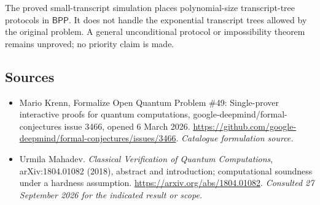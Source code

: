 \documentclass[11pt,a4paper]{article}
\numberwithin{equation}{section}
\begin{document}
The proved small-transcript simulation places polynomial-size transcript-tree
protocols in $\mathsf{BPP}$.  It does not handle the exponential transcript
trees allowed by the original problem.  A general unconditional protocol
or impossibility theorem remains unproved; no priority claim is made.
\subsection{Sources}
\begin{itemize}\raggedright
\item[\textnormal{[S1]}]\hypertarget{source:129:1}{} Mario Krenn, Formalize Open Quantum Problem \#49: Single-prover interactive proofs for quantum computations, google-deepmind/formal-conjectures issue 3466, opened 6 March 2026.
\url{https://github.com/google-deepmind/formal-conjectures/issues/3466}.
{\small\textit{Catalogue formulation source.}}
\item[\textnormal{[E1]}]\hypertarget{extra:129:1}{} Urmila Mahadev.
\emph{Classical Verification of Quantum Computations}, arXiv:1804.01082 (2018), abstract and introduction; computational soundness under a hardness assumption.
\url{https://arxiv.org/abs/1804.01082}.
{\small\textit{Consulted 27 September 2026 for the indicated result or scope.}}
\end{itemize}
\end{document}
